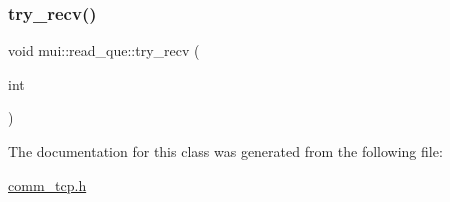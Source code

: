 \mbox{\label{classmui_1_1read__que_a6a444de6e353aba01530eecef26b8397}} 
\subsubsection{\texorpdfstring{try\+\_\+recv()}{try\_recv()}}
{\footnotesize\ttfamily void mui\+::read\+\_\+que\+::try\+\_\+recv (\begin{DoxyParamCaption}\item[{int}]{ }\end{DoxyParamCaption})\hspace{0.3cm}{\ttfamily [inline]}}



The documentation for this class was generated from the following file\+:\begin{DoxyCompactItemize}
\item 
\hyperlink{comm__tcp_8h}{comm\+\_\+tcp.\+h}\end{DoxyCompactItemize}
